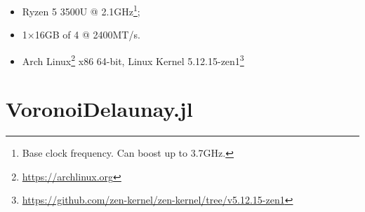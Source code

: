 \begin{itemize}
  \item {}\label{acro:AMD} Ryzen\textsuperscript{\texttrademark} 5 3500U
  \label{acro:CPU} @ 2.1GHz\footnote{Base clock frequency.  Can boost
  up to 3.7GHz.};
  \item 1×16GB \label{acro:SO-DIMM} of \label{acro:DDR}4
  \label{acro:RAM} @ 2400MT/s.
  \item Arch
  Linux\textsuperscript{\texttrademark}\footnote{\url{https://archlinux.org}}
  x86 64-bit, Linux{\textregistered} Kernel
  5.12.15-zen1\footnote{\url{https://github.com/zen-kernel/zen-kernel/tree/v5.12.15-zen1}}
\end{itemize}
\clearpage



\section{VoronoiDelaunay.jl}%
\label{sec:eval.vdjl}



